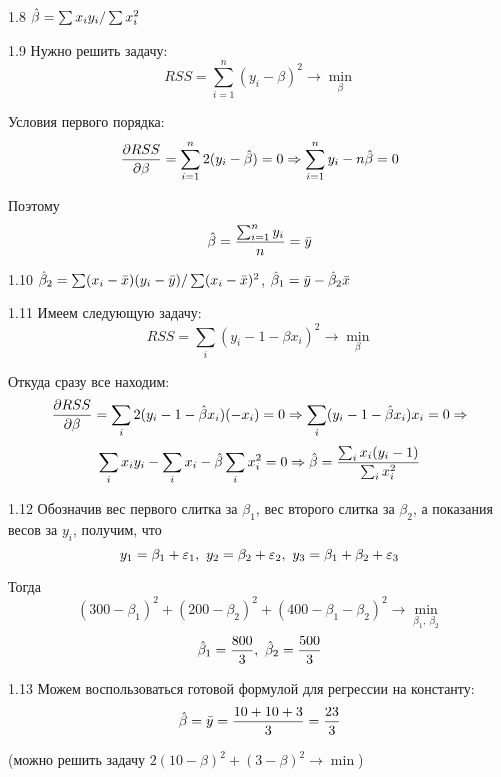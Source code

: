 \protect \hypertarget {soln:1.8}{}
\begin{solution}{{1.8}}
$\hat{\beta}=\sum x_i y_i/\sum x_i^2$
\end{solution}
\protect \hypertarget {soln:1.9}{}
\begin{solution}{{1.9}}
Нужно решить задачу:
\[
RSS = \sum\limits_{i=1}^n(y_i-\beta)^2 \rightarrow \min\limits_{\beta}
\]

Условия первого порядка:
\[
\frac{\partial RSS}{\partial \beta} = \sum\limits_{i=1}^{n}2(y_i-\hat{\beta}) = 0 \Rightarrow \sum\limits_{i=1}^n y_i-n\hat{\beta} = 0
\]

Поэтому
\[
\hat{\beta} = \frac{\sum_{i=1}^ny_i}{n} = \bar{y}
\]
\end{solution}
\protect \hypertarget {soln:1.10}{}
\begin{solution}{{1.10}}
$\hat{\beta}_2=\sum (x_i-\bar{x})(y_i-\bar{y})/\sum(x_i-\bar{x})^2$, $\hat{\beta}_1=\bar{y}-\hat{\beta}_2\bar{x}$
\end{solution}
\protect \hypertarget {soln:1.11}{}
\begin{solution}{{1.11}}
Имеем следующую задачу:
\[
RSS = \sum\limits_i(y_i-1-\beta x_i)^2 \rightarrow \min\limits_{\beta}
\]

Откуда сразу все находим:
\[
\frac{\partial RSS}{\partial \beta} = \sum\limits_i2(y_i-1-\hat{\beta} x_i)(-x_i) = 0 \Rightarrow \sum\limits_i (y_i-1-\hat{\beta} x_i)x_i=0 \Rightarrow
\]
\[
\sum\limits_i x_iy_i-\sum\limits_ix_i - \hat{\beta}\sum\limits_ix_i^2 = 0 \Rightarrow \hat{\beta} = \frac{\sum_ix_i(y_i-1)}{\sum_ix_i^2}
\]
\end{solution}
\protect \hypertarget {soln:1.12}{}
\begin{solution}{{1.12}}
Обозначив вес первого слитка за \(\beta_1\), вес второго слитка за \(\beta_2\), а показания весов за \(y_i\), получим, что
\[y_1 = \beta_1 + \varepsilon_1, \ y_2 = \beta_2 + \varepsilon_2, \ y_3 = \beta_1 + \beta_2 + \varepsilon_3\]

Тогда
\[(300 - \beta_1)^2 + (200 - \beta_2)^2 + (400 - \beta_1 - \beta_2)^2 \rightarrow \min \limits_{\beta_1,\  \beta_2} \]
\[\hat{\beta}_1 = \frac{800}{3}, \ \hat{\beta}_2 = \frac{500}{3} \]
\end{solution}
\protect \hypertarget {soln:1.13}{}
\begin{solution}{{1.13}}
Можем воспользоваться готовой формулой для регрессии на константу:
\[
\hat{\beta} = \bar{y} = \frac{10+10+3}{3} = \frac{23}{3}
\]

(можно решить задачу $2(10-\beta)^2 + (3-\beta)^2\rightarrow \min$)

\end{solution}
\protect \hypertarget {soln:1.14}{}
